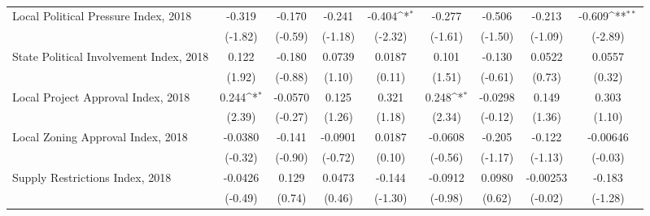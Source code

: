 \begin{table}[htbp]\centering
\def\sym#1{\ifmmode^{#1}\else\(^{#1}\)\fi}
\caption{ \label{tab1}}
\begin{tabular}{l*{8}{c}}
\toprule
\midrule
Local Political Pressure Index, 2018&      -0.319         &      -0.170         &      -0.241         &      -0.404\sym{*}  &      -0.277         &      -0.506         &      -0.213         &      -0.609\sym{**} \\
                    &     (-1.82)         &     (-0.59)         &     (-1.18)         &     (-2.32)         &     (-1.61)         &     (-1.50)         &     (-1.09)         &     (-2.89)         \\
\addlinespace
State Political Involvement Index, 2018&       0.122         &      -0.180         &      0.0739         &      0.0187         &       0.101         &      -0.130         &      0.0522         &      0.0557         \\
                    &      (1.92)         &     (-0.88)         &      (1.10)         &      (0.11)         &      (1.51)         &     (-0.61)         &      (0.73)         &      (0.32)         \\
\addlinespace
Local Project Approval Index, 2018&       0.244\sym{*}  &     -0.0570         &       0.125         &       0.321         &       0.248\sym{*}  &     -0.0298         &       0.149         &       0.303         \\
                    &      (2.39)         &     (-0.27)         &      (1.26)         &      (1.18)         &      (2.34)         &     (-0.12)         &      (1.36)         &      (1.10)         \\
\addlinespace
Local Zoning Approval Index, 2018&     -0.0380         &      -0.141         &     -0.0901         &      0.0187         &     -0.0608         &      -0.205         &      -0.122         &    -0.00646         \\
                    &     (-0.32)         &     (-0.90)         &     (-0.72)         &      (0.10)         &     (-0.56)         &     (-1.17)         &     (-1.13)         &     (-0.03)         \\
\addlinespace
Supply Restrictions Index, 2018&     -0.0426         &       0.129         &      0.0473         &      -0.144         &     -0.0912         &      0.0980         &    -0.00253         &      -0.183         \\
                    &     (-0.49)         &      (0.74)         &      (0.46)         &     (-1.30)         &     (-0.98)         &      (0.62)         &     (-0.02)         &     (-1.28)         \\

\end{tabular}
\end{table}

